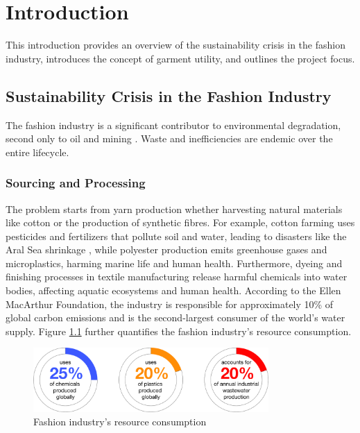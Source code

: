 \chapter{Introduction}

This introduction provides an overview of the sustainability crisis in the fashion industry, introduces the concept of garment utility, and outlines the project focus.

\section{Sustainability Crisis in the Fashion Industry}
The fashion industry is a significant contributor to environmental degradation, second only to oil and mining \cite{charter_accelerating_2024}. Waste and inefficiencies are endemic over the entire lifecycle. 
\subsection{Sourcing and Processing}
The problem starts from yarn production whether harvesting natural materials like cotton or the production of synthetic fibres. For example, cotton farming uses pesticides and fertilizers that pollute soil and water, leading to disasters like the Aral Sea shrinkage \cite{}, while polyester production emits greenhouse gases and microplastics, harming marine life and human health. Furthermore, dyeing and finishing processes in textile manufacturing release harmful chemicals into water bodies, affecting aquatic ecosystems and human health. According to the Ellen MacArthur Foundation, the industry is responsible for approximately 10\% of global carbon emissions and is the second-largest consumer of the world's water supply. Figure \ref{fig:resource_consumption} further quantifies the fashion industry's resource consumption.
\begin{figure} [H]
    \centering
    \includegraphics[width=0.8\textwidth]{Images/sourcing donuts.png}
    \caption{Fashion industry's resource consumption \cite{charter_accelerating_2024}}
    \label{fig:resource_consumption}
\end{figure}
